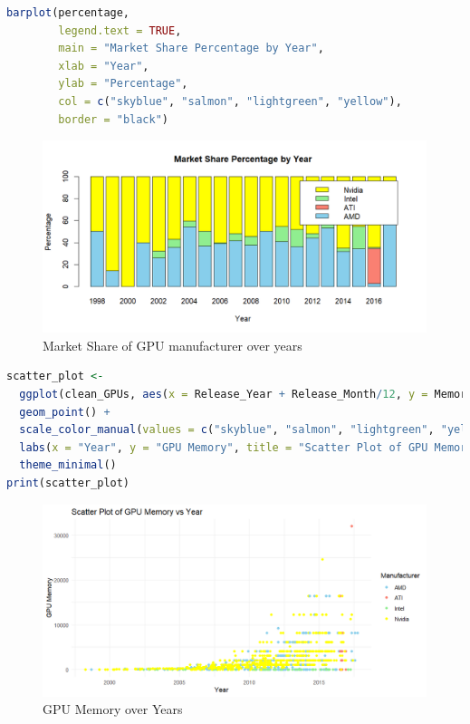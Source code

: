 \begin{lstlisting}[language=R]
barplot(percentage,
        legend.text = TRUE,
        main = "Market Share Percentage by Year",
        xlab = "Year",
        ylab = "Percentage",
        col = c("skyblue", "salmon", "lightgreen", "yellow"),
        border = "black")
\end{lstlisting}

\begin{figure}[ht]
  \centering
  \includegraphics[width=1\linewidth]{img/Market_Percent_Year.png}
  \vspace{1pt}
  \caption{Market Share of GPU manufacturer over years}
\end{figure}

\begin{lstlisting}[language=R]
scatter_plot <- 
  ggplot(clean_GPUs, aes(x = Release_Year + Release_Month/12, y = Memory, color = Manufacturer)) +
  geom_point() +
  scale_color_manual(values = c("skyblue", "salmon", "lightgreen", "yellow")) +
  labs(x = "Year", y = "GPU Memory", title = "Scatter Plot of GPU Memory over Years") +
  theme_minimal()
print(scatter_plot)
\end{lstlisting}

\begin{figure}[ht]
  \centering
  \includegraphics[width=1\linewidth]{img/GPU_Memo_Year.png}
  \vspace{1pt}
  \caption{GPU Memory over Years}
\end{figure}

